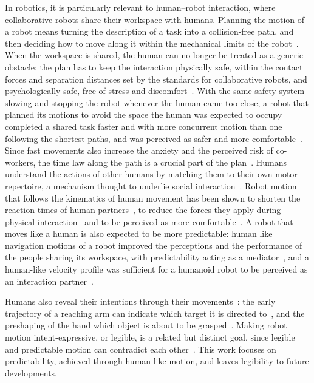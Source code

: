 \documentclass[12pt]{report}
\begin{document}
In robotics, it is particularly relevant to human--robot interaction, where collaborative robots share their workspace with humans. Planning the motion of a robot means turning the description of a task into a collision-free path, and then deciding how to move along it within the mechanical limits of the robot~\cite{lavalle2006}. When the workspace is shared, the human can no longer be treated as a generic obstacle: the plan has to keep the interaction physically safe, within the contact forces and separation distances set by the standards for collaborative robots, and psychologically safe, free of stress and discomfort~\cite{lasota2017}. With the same safety system slowing and stopping the robot whenever the human came too close, a robot that planned its motions to avoid the space the human was expected to occupy completed a shared task faster and with more concurrent motion than one following the shortest paths, and was perceived as safer and more comfortable~\cite{lasota2015}. Since fast movements also increase the anxiety and the perceived risk of co-workers, the time law along the path is a crucial part of the plan~\cite{coccaro}. Humans understand the actions of other humans by matching them to their own motor repertoire, a mechanism thought to underlie social interaction~\cite{bisio2014}. Robot motion that follows the kinematics of human movement has been shown to shorten the reaction times of human partners~\cite{huber2008}, to reduce the forces they apply during physical interaction~\cite{maurice2018} and to be perceived as more comfortable~\cite{coccaro}. A robot that moves like a human is also expected to be more predictable: human like navigation motions of a robot improved the perceptions and the performance of the people sharing its workspace, with predictability acting as a mediator~\cite{humanlikemotion}, and a human-like velocity profile was sufficient for a humanoid robot to be perceived as an interaction partner~\cite{kupferberg2011}.

Humans also reveal their intentions through their movements~\cite{becchio2012grasping}: the early trajectory of a reaching arm can indicate which target it is directed to~\cite{perezdarpino2015}, and the preshaping of the hand which object is about to be grasped~\cite{ambrosini2011grasping}. Making robot motion intent-expressive, or legible, is a related but distinct goal, since legible and predictable motion can contradict each other~\cite{dragan2013}. This work focuses on predictability, achieved through human-like motion, and leaves legibility to future developments.
\end{document}
